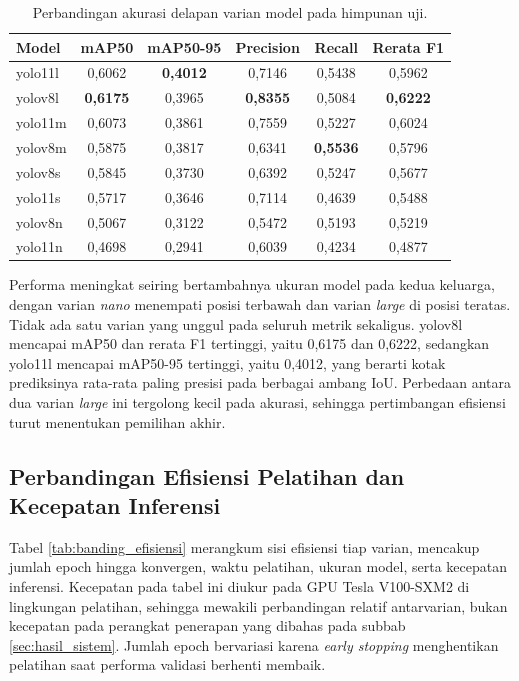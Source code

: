 \begin{table}[htbp]
    \centering
    \caption{Perbandingan akurasi delapan varian model pada himpunan uji.}
    \label{tab:banding_akurasi}
    \begin{tabular}{lccccc}
        \hline
        \textbf{Model} & \textbf{mAP50} & \textbf{mAP50-95} & \textbf{Precision} & \textbf{Recall} & \textbf{Rerata F1} \\
        \hline \hline
        yolo11l & 0,6062 & \textbf{0,4012} & 0,7146 & 0,5438 & 0,5962 \\
        yolov8l & \textbf{0,6175} & 0,3965 & \textbf{0,8355} & 0,5084 & \textbf{0,6222} \\
        yolo11m & 0,6073 & 0,3861 & 0,7559 & 0,5227 & 0,6024 \\
        yolov8m & 0,5875 & 0,3817 & 0,6341 & \textbf{0,5536} & 0,5796 \\
        yolov8s & 0,5845 & 0,3730 & 0,6392 & 0,5247 & 0,5677 \\
        yolo11s & 0,5717 & 0,3646 & 0,7114 & 0,4639 & 0,5488 \\
        yolov8n & 0,5067 & 0,3122 & 0,5472 & 0,5193 & 0,5219 \\
        yolo11n & 0,4698 & 0,2941 & 0,6039 & 0,4234 & 0,4877 \\
        \hline
    \end{tabular}
\end{table}

Performa meningkat seiring bertambahnya ukuran model pada kedua keluarga, dengan varian 
\textit{nano} menempati posisi terbawah dan varian \textit{large} di posisi teratas. Tidak 
ada satu varian yang unggul pada seluruh metrik sekaligus. yolov8l mencapai mAP50 dan 
rerata F1 tertinggi, yaitu 0,6175 dan 0,6222, sedangkan yolo11l mencapai mAP50-95 tertinggi, 
yaitu 0,4012, yang berarti kotak prediksinya rata-rata paling presisi pada berbagai ambang 
IoU. Perbedaan antara dua varian \textit{large} ini tergolong kecil pada akurasi, sehingga 
pertimbangan efisiensi turut menentukan pemilihan akhir.

\subsection{Perbandingan Efisiensi Pelatihan dan Kecepatan Inferensi}
\label{sec:perbandingan_efisiensi}

Tabel \ref{tab:banding_efisiensi} merangkum sisi efisiensi tiap varian, mencakup jumlah 
epoch hingga konvergen, waktu pelatihan, ukuran model, serta kecepatan inferensi. Kecepatan 
pada tabel ini diukur pada GPU Tesla V100-SXM2 di lingkungan pelatihan, sehingga mewakili 
perbandingan relatif antarvarian, bukan kecepatan pada perangkat penerapan yang dibahas 
pada subbab \ref{sec:hasil_sistem}. Jumlah epoch bervariasi karena \textit{early stopping} 
menghentikan pelatihan saat performa validasi berhenti membaik.

